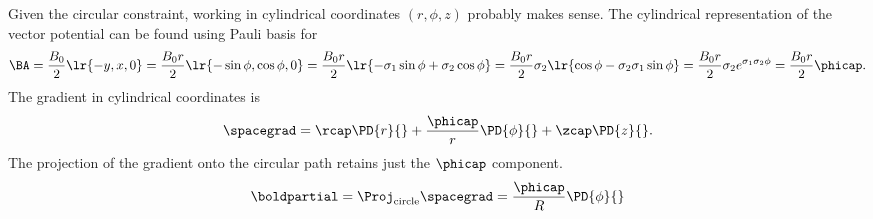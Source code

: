 %
%
Given the circular constraint, working in cylindrical coordinates \( ( r, \phi, z ) \) probably makes sense.  The cylindrical representation of the vector potential can be found using Pauli basis for 
%
\begin{dmath}\label{eqn:gradQuantumProblemSet3Problem2:40}
\BA
= \frac{B_0}{2} \lr{ -y, x, 0 }
= \frac{B_0 r}{2} \lr{ -\sin\phi, \cos\phi, 0 }
= \frac{B_0 r}{2} \lr{ - \sigma_1 \sin\phi + \sigma_2 \cos\phi }
= \frac{B_0 r}{2} \sigma_2 \lr{ \cos\phi - \sigma_2 \sigma_1 \sin\phi }
= \frac{B_0 r}{2} \sigma_2 e^{ \sigma_1 \sigma_2 \phi}
= \frac{B_0 r}{2} \phicap.
\end{dmath}
%
The gradient in cylindrical coordinates is
%
\begin{equation}\label{eqn:gradQuantumProblemSet3Problem2:60}
\spacegrad = \rcap \PD{r}{} + \frac{\phicap}{r} \PD{\phi}{} + \zcap \PD{z}{}.
\end{equation}
%
The projection of the gradient onto the circular path retains just the \( \phicap \) component.
%
\begin{equation}\label{eqn:gradQuantumProblemSet3Problem2:120}
\boldpartial = \Proj_{\textrm{circle}} \spacegrad = \frac{\phicap}{R} \PD{\phi}{}
\end{equation}

